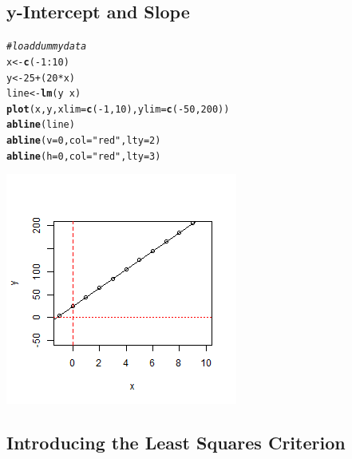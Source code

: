 \documentclass{article}\usepackage[]{graphicx}\usepackage[]{color}
\makeatletter
\def\maxwidth{ %
  \ifdim\Gin@nat@width>\linewidth
    \linewidth
  \else
    \Gin@nat@width
  \fi
}
\newcommand{\hlnum}[1]{\textcolor[rgb]{0.686,0.059,0.569}{#1}}%
\newcommand{\hlstr}[1]{\textcolor[rgb]{0.192,0.494,0.8}{#1}}%
\newcommand{\hlcom}[1]{\textcolor[rgb]{0.678,0.584,0.686}{\textit{#1}}}%
\newcommand{\hlopt}[1]{\textcolor[rgb]{0,0,0}{#1}}%
\newcommand{\hlstd}[1]{\textcolor[rgb]{0.345,0.345,0.345}{#1}}%
\newcommand{\hlkwb}[1]{\textcolor[rgb]{0.69,0.353,0.396}{#1}}%
\newcommand{\hlkwc}[1]{\textcolor[rgb]{0.333,0.667,0.333}{#1}}%
\newcommand{\hlkwd}[1]{\textcolor[rgb]{0.737,0.353,0.396}{\textbf{#1}}}%
\newenvironment{kframe}{%
 \def\at@end@of@kframe{}%
 \ifinner\ifhmode%
  \def\at@end@of@kframe{\end{minipage}}%
  \begin{minipage}{\columnwidth}%
 \fi\fi%
 \def\FrameCommand##1{\hskip\@totalleftmargin \hskip-\fboxsep
 \colorbox{shadecolor}{##1}\hskip-\fboxsep
     \hskip-\linewidth \hskip-\@totalleftmargin \hskip\columnwidth}%
 \MakeFramed {\advance\hsize-\width
   \@totalleftmargin\z@ \linewidth\hsize
   \@setminipage}}%
 {\par\unskip\endMakeFramed%
 \at@end@of@kframe}
\newenvironment{knitrout}{}{} %
\makeatother
\begin{document}
\subsection{y-Intercept and Slope}
\begin{knitrout}
\color{fgcolor}\begin{kframe}
\begin{alltt}
\hlcom{# load dummy data}
\hlstd{x} \hlkwb{<-} \hlkwd{c}\hlstd{(}\hlopt{-}\hlnum{1}\hlopt{:}\hlnum{10}\hlstd{)}
\hlstd{y} \hlkwb{<-} \hlnum{25} \hlopt{+} \hlstd{(}\hlnum{20} \hlopt{*} \hlstd{x)}
\hlstd{line} \hlkwb{<-} \hlkwd{lm}\hlstd{(y} \hlopt{~} \hlstd{x)}
\hlkwd{plot}\hlstd{(x, y,} \hlkwc{xlim} \hlstd{=} \hlkwd{c}\hlstd{(}\hlopt{-}\hlnum{1}\hlstd{,}\hlnum{10}\hlstd{),} \hlkwc{ylim} \hlstd{=} \hlkwd{c}\hlstd{(}\hlopt{-}\hlnum{50}\hlstd{,}\hlnum{200}\hlstd{))}
\hlkwd{abline}\hlstd{(line)}
\hlkwd{abline}\hlstd{(}\hlkwc{v}\hlstd{=}\hlnum{0}\hlstd{,}\hlkwc{col}\hlstd{=}\hlstr{"red"}\hlstd{,} \hlkwc{lty} \hlstd{=} \hlnum{2}\hlstd{)}
\hlkwd{abline}\hlstd{(}\hlkwc{h}\hlstd{=}\hlnum{0}\hlstd{,}\hlkwc{col}\hlstd{=}\hlstr{"red"}\hlstd{,} \hlkwc{lty} \hlstd{=} \hlnum{3}\hlstd{)}
\end{alltt}
\end{kframe}
\includegraphics[width=\maxwidth]{figure/ex14-02} 

\end{knitrout}

\subsection{Introducing the Least Squares Criterion}
\end{document}
